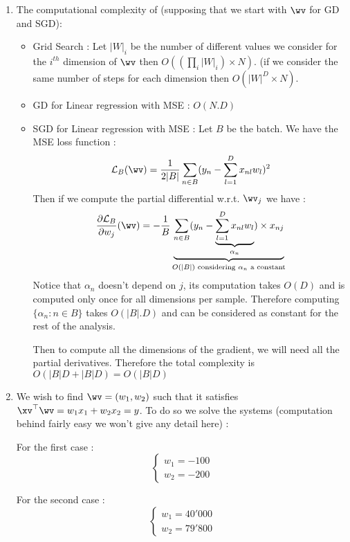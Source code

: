\documentclass{../../tex_import/ETHuebung_english}
\begin{document}
\begin{enumerate}
\begin{enumerate}
		\item The computational complexity of (supposing that we start with $\wv$ for GD and SGD): 
			\begin{itemize}
				\item Grid Search : Let $|W|_i$ be the number of different values we consider for the $i^{th}$ dimension of $\wv$ then $O((\prod_i|W|_i )\times N)$. (if we consider the same number of steps for each dimension then $O(|W|^D\times N)$.
				\item GD for Linear regression with MSE : $O(N.D)$
				\item SGD for Linear regression with MSE : Let $B$ be the batch. We have the MSE loss function :
					\begin{equation}
						\mathcal{L}_B(\wv) = \frac{1}{2|B|} \sum_{n \in B} (y_n - \sum_{l=1}^D x_{nl}w_{l})^2
					\end{equation}
					Then if we compute the partial differential w.r.t. $\wv_{j}$ we have :
					\begin{equation}
						\frac{\partial\mathcal{L}_B}{\partial w_{j}}(\wv) = -\frac{1}{B} \underbrace{\sum_{n\in B} (y_n - \underbrace{\sum_{l=1}^D x_{nl}w_{l}}_{\alpha_n}) \times x_{nj}}_{O(|B|)\text{ considering  }\alpha_n \text{ a constant}}
					\end{equation}
					Notice that $\alpha_n$ doesn't depend on $j$, its computation takes $O(D)$ and is computed only once for all dimensions per sample. Therefore computing $\{\alpha_n : n \in B\}$ takes $O(|B|.D)$ and can be considered as constant for the rest of the analysis.
					
					Then to compute all the dimensions of the gradient, we will need all the partial derivatives. Therefore the total complexity is $O(|B|D+|B|D) = O (|B|D)$
			\end{itemize}
		
		\item We wish to find $\wv = (w_1,w_2)$ such that it satisfies $\xv^\top\wv = w_1 x_1 + w_2 x_2 = y$. To do so we solve the systems (computation behind fairly easy we won't give any detail here) :
			
			For the first case :
			\begin{equation*}
				\begin{cases}
					w_1 = -100\\
					w_2 = -200
				\end{cases}
			\end{equation*}
			
			For the second case :
			\begin{equation*}
				\begin{cases}
					w_1 = 40'000\\
					w_2 = 79'800
				\end{cases}
			\end{equation*}
	\end{enumerate}
	

\end{enumerate}
\end{document}
